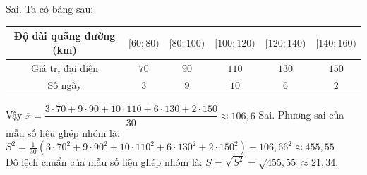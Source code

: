 \begin{ex}
{\begin{itemchoice}
			\itemch Sai. Ta có bảng sau:\\
			\begin{tabular}{|c|c|c|c|c| c|}
				\hline
				Độ dài quãng đường (km) & $[60;80)$  & $[80;100)$  & $[100;120)$  & $[120;140)$  & $[140;160)$   \\
				\hline
				Giá trị đại diện & $70$  & $90$ & $110$ & $130$  & $150$  \\
				\hline
				Số ngày & $3$  & $9$ & $10$ & $6$  & $2$  \\
				\hline
			\end{tabular}
			
			Vậy	$\overline x  = \dfrac{{3\cdot70 + 9\cdot90 + 10\cdot110 + 6\cdot130 + 2\cdot150}}{{30}} \approx 106{,}6$
			\itemch Sai. Phương sai của mẫu số liệu ghép nhóm là:\\
			${S^2} = \frac{1}{30}( 3\cdot70^2 + 9\cdot90^2 + 10\cdot110^2 + 6\cdot130^2 + 2\cdot150^2 ) - 106{,}66^2 \approx 455{,}55$\\
			Độ lệch chuẩn của mẫu số liệu ghép nhóm là:  $S = \sqrt {{S^2}}  = \sqrt {455{,}55}  \approx 21{,}34$.
			
		\end{itemchoice}
	}
\end{ex}


